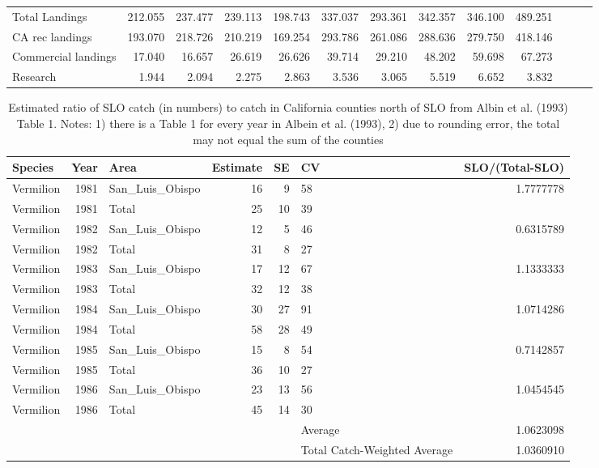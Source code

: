 \documentclass[
  english,
  a4paper,
]{article}
\begin{document}
\begin{table}
{\begin{tabular}[t]{lrrrrrrrrrrrr}
\hspace{1em}Total Landings & 212.055 & 237.477 & 239.113 & 198.743 & 337.037 & 293.361 & 342.357 & 346.100 & 489.251 &  &  & \\
\hspace{1em}CA rec landings & 193.070 & 218.726 & 210.219 & 169.254 & 293.786 & 261.086 & 288.636 & 279.750 & 418.146 &  &  & \\
\hspace{1em}Commercial landings & 17.040 & 16.657 & 26.619 & 26.626 & 39.714 & 29.210 & 48.202 & 59.698 & 67.273 &  &  & \\
\hspace{1em}Research & 1.944 & 2.094 & 2.275 & 2.863 & 3.536 & 3.065 & 5.519 & 6.652 & 3.832 &  &  & \\
\bottomrule
\end{tabular}}
\end{table}





\begin{table}

\caption{\label{tab:albin}Estimated ratio of SLO catch (in numbers) to catch in California 
  counties north of SLO from Albin et al. (1993) Table 1.  Notes: 1) there is a Table 
  1 for every year in Albein et al. (1993), 2) due to rounding error, the total may not 
  equal the sum of the counties}
\centering
\fontsize{10}{12}\selectfont
\begin{tabular}[t]{lrlrrlr}
\toprule
Species & Year & Area & Estimate & SE & CV & SLO/(Total-SLO)\\
\midrule
Vermilion & 1981 & San\_Luis\_Obispo & 16 & 9 & 58 & 1.7777778\\
Vermilion & 1981 & Total & 25 & 10 & 39 & \\
Vermilion & 1982 & San\_Luis\_Obispo & 12 & 5 & 46 & 0.6315789\\
Vermilion & 1982 & Total & 31 & 8 & 27 & \\
Vermilion & 1983 & San\_Luis\_Obispo & 17 & 12 & 67 & 1.1333333\\
\addlinespace
Vermilion & 1983 & Total & 32 & 12 & 38 & \\
Vermilion & 1984 & San\_Luis\_Obispo & 30 & 27 & 91 & 1.0714286\\
Vermilion & 1984 & Total & 58 & 28 & 49 & \\
Vermilion & 1985 & San\_Luis\_Obispo & 15 & 8 & 54 & 0.7142857\\
Vermilion & 1985 & Total & 36 & 10 & 27 & \\
\addlinespace
Vermilion & 1986 & San\_Luis\_Obispo & 23 & 13 & 56 & 1.0454545\\
Vermilion & 1986 & Total & 45 & 14 & 30 & \\
 &  &  &  &  & Average & 1.0623098\\
 &  &  &  &  & Total Catch-Weighted Average & 1.0360910\\
\bottomrule
\end{tabular}
\end{table}
\end{document}
